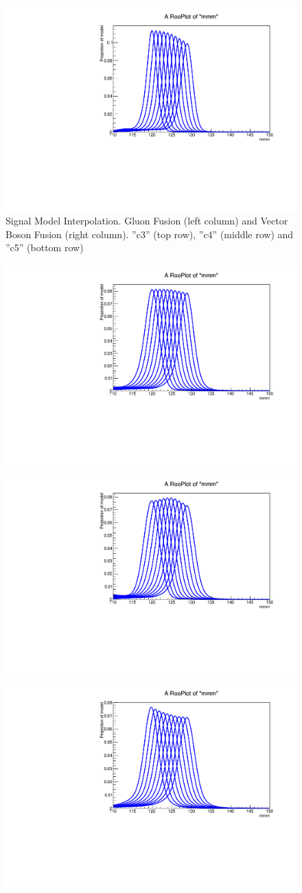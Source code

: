 \begin{figure}[hbp]
  \includegraphics[width=0.49\linewidth]{figures/signal_model/AppendixBdt/interpolation_VBF_cat5.pdf}
  \caption{Signal Model Interpolation. Gluon Fusion (left column) and Vector Boson Fusion (right column). ''c3'' (top row), ''c4'' (middle row) and ''c5'' (bottom row)}
  \label{fig:higgs_signalmodel_gluvbfc3c5}
\end{figure}
\begin{figure}[hbp]
  \centering
  \includegraphics[width=0.49\linewidth]{figures/signal_model/AppendixBdt/interpolation_GluGlu_cat6.pdf}
  \includegraphics[width=0.49\linewidth]{figures/signal_model/AppendixBdt/interpolation_VBF_cat6.pdf}\\
  \includegraphics[width=0.49\linewidth]{figures/signal_model/AppendixBdt/interpolation_GluGlu_cat7.pdf}

\end{figure}
